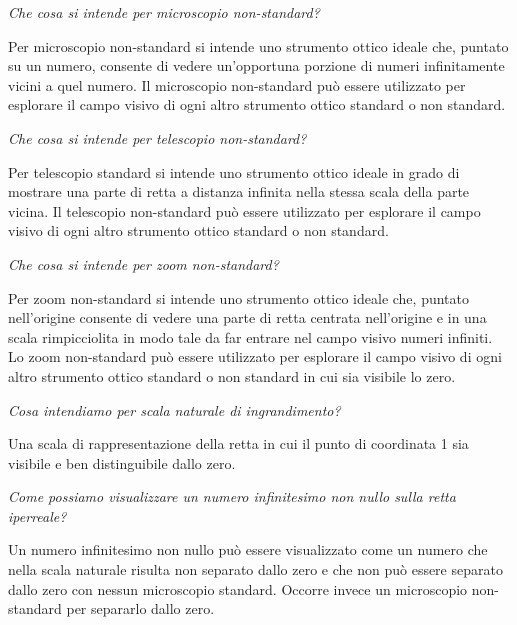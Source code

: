 \begin{esercizio}\label{ese:iper_034} 
\emph{Che cosa si intende per microscopio non-standard?}

Per microscopio non-standard si intende uno strumento ottico ideale che, 
puntato su un numero, consente di vedere un'opportuna porzione di numeri 
infinitamente vicini a quel numero. 
Il microscopio non-standard può essere utilizzato per esplorare il campo 
visivo di ogni altro strumento ottico standard o non standard.

\end{esercizio}

\begin{esercizio}\label{ese:iper_035} 
\emph{Che cosa si intende per telescopio non-standard?}

Per telescopio standard si intende uno strumento ottico ideale in grado di 
mostrare una parte di retta a distanza infinita nella stessa scala della 
parte vicina. Il telescopio non-standard può essere utilizzato per esplorare 
il campo visivo di ogni altro strumento ottico standard o non standard.
\end{esercizio}

\begin{esercizio}\label{ese:iper_036} 
\emph{Che cosa si intende per zoom non-standard?}

Per zoom non-standard si intende uno strumento ottico ideale che, puntato 
nell'origine consente di vedere una parte di retta centrata nell'origine e 
in una scala rimpicciolita in modo tale da far entrare nel campo visivo 
numeri infiniti. 
Lo zoom non-standard può essere utilizzato per esplorare il campo 
visivo di ogni altro strumento ottico standard o non standard in cui sia 
visibile lo zero.
\end{esercizio}

\begin{esercizio}\label{ese:iper_037} 
\emph{Cosa intendiamo per scala naturale di ingrandimento?}

Una scala di rappresentazione della retta in cui il punto di coordinata 1 
sia visibile e ben distinguibile dallo zero.
\end{esercizio}

\begin{esercizio}\label{ese:iper_038} 
\emph{Come possiamo visualizzare un numero infinitesimo non nullo sulla 
retta iperreale?}

Un numero infinitesimo non nullo può essere visualizzato come un numero che 
nella scala naturale risulta non separato dallo zero e che non può essere 
separato dallo zero con nessun microscopio standard. Occorre invece un 
microscopio non-standard per separarlo dallo zero.
\end{esercizio}


